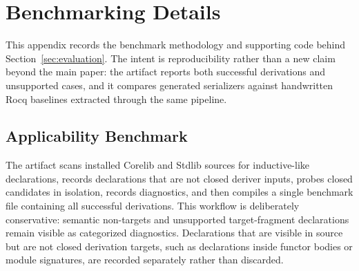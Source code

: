\section{Benchmarking Details}
\label{app:benchmarking}

This appendix records the benchmark methodology and supporting code behind
Section~\ref{sec:evaluation}.  The intent is reproducibility rather than a new
claim beyond the main paper: the artifact reports both successful derivations
and unsupported cases, and it compares generated serializers against handwritten
Rocq baselines extracted through the same pipeline.

\subsection{Applicability Benchmark}

The artifact scans installed Corelib and Stdlib sources for inductive-like
declarations, records declarations that are not closed deriver inputs, probes
closed candidates in isolation, records diagnostics, and then compiles a single
benchmark file containing all successful derivations.  This workflow is
deliberately conservative: semantic non-targets and unsupported target-fragment
declarations remain visible as categorized diagnostics.  Declarations that are
visible in source but are not closed derivation targets, such as declarations
inside functor bodies or module signatures, are recorded separately rather than
discarded.

